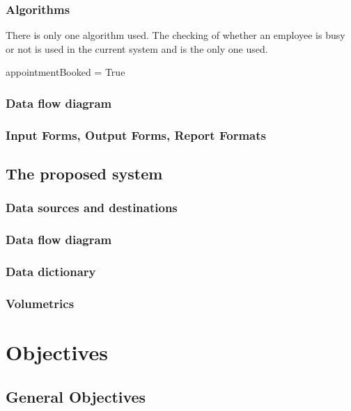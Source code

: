 \subsubsection{Algorithms}
There is only one algorithm used. The checking of whether an employee is busy or not is used in the current system and is the only one used.

\begin{algorithm}
 \state {} \state appointmentBooked = True \endif
\end{algorithm}

\subsubsection{Data flow diagram}

\subsubsection{Input Forms, Output Forms, Report Formats}

\subsection{The proposed system}

\subsubsection{Data sources and destinations}

\subsubsection{Data flow diagram}

\subsubsection{Data dictionary}

\subsubsection{Volumetrics}

\section{Objectives}

\subsection{General Objectives}

